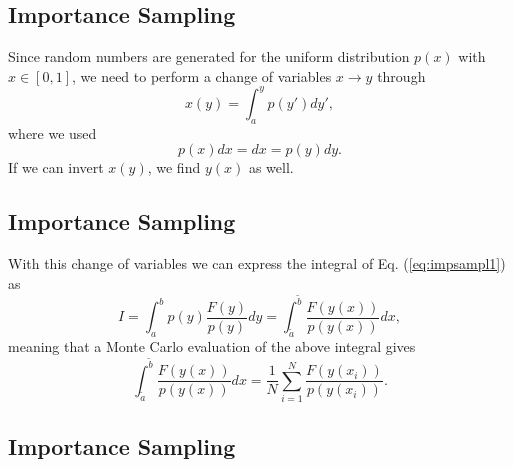 \documentclass[%
oneside,                 %
final,                   %
10pt]{article}
\newenvironment{block_mdfboxadmon}[1][]{
\begin{block_mdfboxmdframed}[frametitle=#1]
}
{
\end{block_mdfboxmdframed}
}
\begin{document}
\subsection{Importance Sampling}

\begin{block_mdfboxadmon}[]
Since random numbers are generated for the uniform distribution $p(x)$
with $x\in [0,1]$, we need to perform a change of variables $x\rightarrow y$
through
\begin{equation*}
     x(y)=\int_a^y p(y')dy',
\end{equation*}
where we used
\begin{equation*}
   p(x)dx=dx=p(y)dy. 
\end{equation*}
If we can invert $x(y)$, we find $y(x)$ as well.
\end{block_mdfboxadmon} %




\subsection{Importance Sampling}

\begin{block_mdfboxadmon}[]
With this change of variables we can express the integral of 
Eq. (\ref{eq:impsampl1}) as
\begin{equation*}
   I=\int_a^b p(y)\frac{F(y)}{p(y)} dy=\int_{\tilde{a}}^{\tilde{b}}\frac{F(y(x))}{p(y(x))} dx,
\end{equation*}
meaning that a Monte Carlo evaluation of the above integral gives
\begin{equation*}
\int_{\tilde{a}}^{\tilde{b}}\frac{F(y(x))}{p(y(x))} dx=
\frac{1}{N}\sum_{i=1}^N\frac{F(y(x_i))}{p(y(x_i))}.
\end{equation*}
\end{block_mdfboxadmon} %



\subsection{Importance Sampling}
\end{document}
